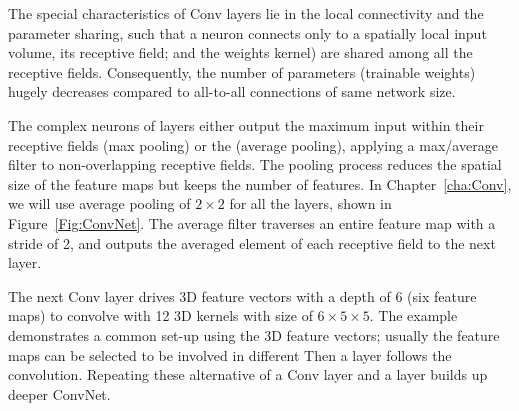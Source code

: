 The special characteristics of Conv layers lie in the local connectivity and the parameter sharing, such that a neuron connects only to a spatially local input volume, its receptive field; and the weights \protect{} \protect{} kernel) are shared among all the receptive fields.
Consequently, the number of parameters (trainable weights) hugely decreases compared to all-to-all connections of \protect{} same network size. 

The complex neurons of \protect{} \protect{} layers either output the maximum input within their receptive fields (max pooling) or the \protect{} \protect{} (average pooling), \protect{} \protect{} applying a max/average filter to non-overlapping receptive fields.
The pooling process reduces the spatial size of the feature maps but keeps the number of features.
In Chapter~\ref{cha:Conv}, we will use average pooling of $2\times2$ for all the \protect{} \protect{} layers, \protect{} shown in Figure~\ref{Fig:ConvNet}.
The average filter traverses \protect{} an entire feature map with a stride of 2, and outputs the averaged element of each receptive field to the next layer.

The next Conv layer drives 3D feature vectors with a depth of 6 (six feature maps) to convolve with 12 3D kernels with size of $6\times5\times5$.
The example demonstrates a common set-up using \protect{} the \protect{} 3D feature vectors; usually the \protect{} feature maps can be selected to \protect{} be involved in \protect{} different \protect{} \protect{}
Then a \protect{} \protect{} layer follows the convolution.
Repeating these alternative \protect{} \protect{} of a Conv layer and a \protect{} \protect{} layer builds up \protect{} deeper ConvNet.

